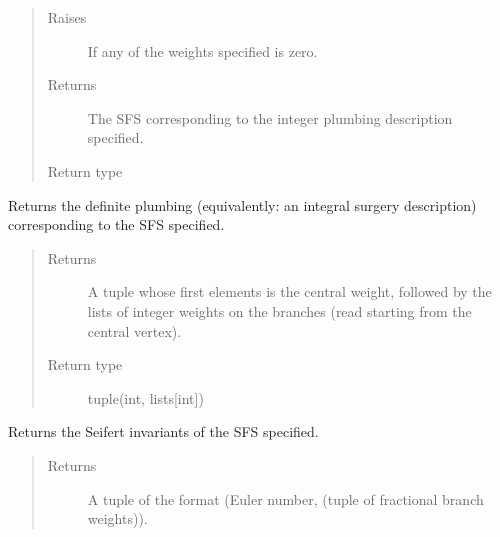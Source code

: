 \documentclass[letterpaper,10pt,english]{sphinxmanual}
\begin{document}
\begin{fulllineitems}
\begin{fulllineitems}
\begin{quote}
\begin{description}
\begin{itemize}
\end{itemize}

\item[{Raises}] \leavevmode
\sphinxAtStartPar
{} \textendash{} If any of the weights specified is zero.

\item[{Returns}] \leavevmode
\sphinxAtStartPar
The SFS corresponding to the integer plumbing description specified.

\item[{Return type}] \leavevmode
\sphinxAtStartPar
{\hyperref[\detokenize{soapy:soapy.SFS}]{}}

\end{description}\end{quote}

\end{fulllineitems}


\begin{fulllineitems}
\label{\detokenize{soapy:soapy.SFS.to_plumbing}}
\sphinxAtStartPar
Returns the definite plumbing (equivalently: an integral surgery description) corresponding to the SFS specified.
\begin{quote}\begin{description}
\item[{Returns}] \leavevmode
\sphinxAtStartPar
A tuple whose first elements is the central weight, followed by the lists of integer weights on the branches (read starting from the central vertex).

\item[{Return type}] \leavevmode
\sphinxAtStartPar
tuple(int, lists{[}int{]})

\end{description}\end{quote}

\end{fulllineitems}


\begin{fulllineitems}
\label{\detokenize{soapy:soapy.SFS.seifert_invariants}}
\sphinxAtStartPar
Returns the Seifert invariants of the SFS specified.
\begin{quote}\begin{description}
\item[{Returns}] \leavevmode
\sphinxAtStartPar
A tuple of the format (Euler number, (tuple of fractional branch weights)).


\end{description}
\end{quote}
\end{fulllineitems}
\end{fulllineitems}
\end{document}
